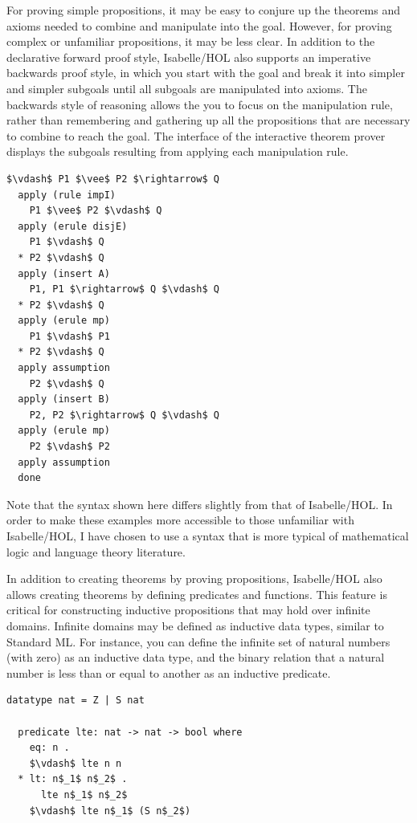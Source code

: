 \documentclass[letterpaper, 11pt]{report}
\begin{document}
For proving simple propositions, it may be easy to conjure up the theorems and axioms needed to
combine and manipulate into the goal. However, for proving complex or unfamiliar propositions,
it may be less clear. In addition to the declarative forward proof style, Isabelle/HOL also
supports an imperative backwards proof style, in which you start with the goal and break it into simpler
and simpler subgoals until all subgoals are manipulated into axioms. The backwards style of reasoning
allows the you to focus on the manipulation rule, rather than remembering and gathering up all the
propositions that are necessary to combine to reach the goal.
The interface of the interactive theorem prover displays the subgoals
resulting from applying each manipulation rule.


\begin{lstlisting}[language=logic, mathescape]
  $\vdash$ P1 $\vee$ P2 $\rightarrow$ Q
  apply (rule impI)
    P1 $\vee$ P2 $\vdash$ Q
  apply (erule disjE)
    P1 $\vdash$ Q
  * P2 $\vdash$ Q
  apply (insert A)
    P1, P1 $\rightarrow$ Q $\vdash$ Q
  * P2 $\vdash$ Q
  apply (erule mp)
    P1 $\vdash$ P1
  * P2 $\vdash$ Q
  apply assumption 
    P2 $\vdash$ Q
  apply (insert B)
    P2, P2 $\rightarrow$ Q $\vdash$ Q
  apply (erule mp)
    P2 $\vdash$ P2
  apply assumption 
  done
\end{lstlisting}

Note that the syntax shown here differs slightly from that of Isabelle/HOL.
In order to make these examples more accessible to those unfamiliar with Isabelle/HOL, I have chosen
to use a syntax that is more typical of mathematical logic and language theory literature.

In addition to creating theorems by proving propositions, Isabelle/HOL also allows creating theorems
by defining predicates and functions. This feature is critical for constructing inductive propositions that may hold
over infinite domains. Infinite domains may be defined as inductive data types, similar to Standard ML.
For instance, you can define the infinite set of natural numbers (with zero) as an inductive data type,
and the binary relation that a natural number is less than or equal to another as an inductive predicate.

\begin{lstlisting}[language=logic]
  datatype nat = Z | S nat
  
  predicate lte: nat -> nat -> bool where
    eq: n . 
    $\vdash$ lte n n
  * lt: n$_1$ n$_2$ . 
      lte n$_1$ n$_2$ 
    $\vdash$ lte n$_1$ (S n$_2$)
\end{lstlisting}
\end{document}
